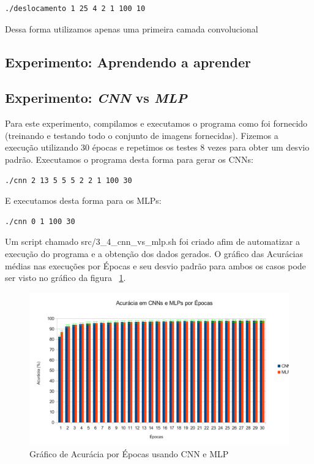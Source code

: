 \documentclass[12pt, a4paper, brazil, portuguese]{article}
\begin{document}
\begin{verbatim}
./deslocamento 1 25 4 2 1 100 10
\end{verbatim}

Dessa forma utilizamos apenas uma primeira camada convolucional

\subsection{Experimento: Aprendendo a aprender}
\subsection{Experimento: \emph{CNN} vs \emph{MLP}}

Para este experimento, compilamos e executamos o programa como foi fornecido (treinando e testando
todo o conjunto de imagens fornecidas). Fizemos a execução utilizando 30 épocas e repetimos os
testes 8 vezes para obter um desvio padrão. Executamos o programa desta forma para gerar os CNNs:

\begin{verbatim}
./cnn 2 13 5 5 5 2 2 1 100 30
\end{verbatim}

E executamos desta forma para os MLPs:

\begin{verbatim}
./cnn 0 1 100 30
\end{verbatim}

Um script chamado src\//3\_4\_cnn\_vs\_mlp.sh foi criado afim de automatizar a execução do programa
e a obtenção dos dados gerados. O gráfico das Acurácias médias nas execuções por Épocas e seu desvio
padrão para ambos os casos pode ser visto no gráfico da figura ~\ref{fig:cnn_mlp}.

\begin{figure}
  \centering
  \includegraphics[width = \textwidth]{gra.pdf}
  \caption{Gráfico de Acurácia por Épocas usando CNN e MLP}
  \label{fig:cnn_mlp}
\end{figure}
\end{document}
